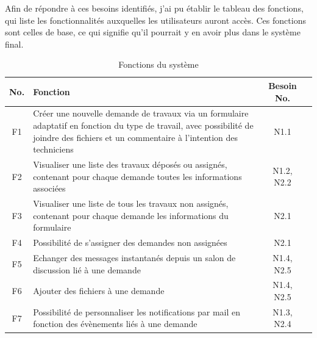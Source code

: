 \documentclass[
    iai, %
    eai, %
]{heig-tb}
\begin{document}
\newpage
Afin de répondre à ces besoins identifiés, j'ai pu établir le tableau des fonctions, qui liste les fonctionnalités auxquelles les utilisateurs auront accès.
Ces fonctions sont celles de base, ce qui signifie qu'il pourrait y en avoir plus dans le système final.

\begin{table}[h]
  \begin{center}
    \caption{Fonctions du système}
    \begin{tabularx}{\textwidth}{cXcc}
      No. & Fonction                                                                                                                                                                                   & Besoin No. \\ \toprule
      F1  & Créer une nouvelle demande de travaux via un formulaire adaptatif en fonction du type de travail, avec possibilité de joindre des fichiers et un commentaire à l'intention des techniciens & N1.1       \\ \midrule
      F2  & Visualiser une liste des travaux déposés ou assignés, contenant pour chaque demande toutes les informations associées                                                                      & N1.2, N2.2 \\ \midrule
      F3  & Visualiser une liste de tous les travaux non assignés, contenant pour chaque demande les informations du formulaire                                                                        & N2.1       \\ \midrule
      F4  & Possibilité de s'assigner des demandes non assignées                                                                                                                                       & N2.1       \\ \midrule
      F5  & Echanger des messages instantanés depuis un salon de discussion lié à une demande                                                                                                          & N1.4, N2.5 \\ \midrule
      F6  & Ajouter des fichiers à une demande                                                                                                                                                         & N1.4, N2.5 \\ \midrule
      F7  & Possibilité de personnaliser les notifications par mail en fonction des évènements liés à une demande                                                                                      & N1.3, N2.4 \\ \midrule

\end{tabularx}
\end{center}
\end{table}
\end{document}
